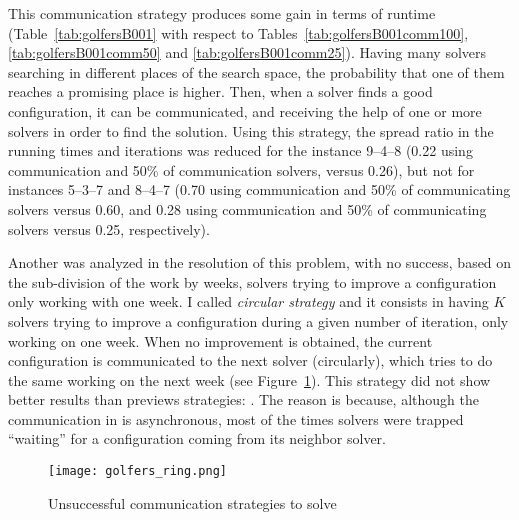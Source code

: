 This communication strategy produces some gain in terms of runtime (Table~\ref{tab:golfersB001} with respect to Tables~\ref{tab:golfersB001comm100}, \ref{tab:golfersB001comm50} and \ref{tab:golfersB001comm25}). 
Having many solvers searching in different places of the search space, the probability that one of them reaches a promising place is higher. Then, when a solver finds a good configuration, it can be communicated, and receiving the help of one or more solvers in order to find the solution.
Using this strategy, the spread ratio in the running times and iterations  was reduced for the instance 9--4--8 (0.22 using communication \oneTone{} and 50\% of communication solvers, versus 0.26), but not for instances 5--3--7 and 8--4--7 (0.70 using communication \oneTn{} and 50\% of communicating solvers versus 0.60, and 0.28 using communication \oneTone{} and 50\% of communicating solvers versus 0.25, respectively).


Another \commstr{} was analyzed in the resolution of this problem, with no success, based on the sub-division of the work by weeks, \ie solvers trying to improve a configuration only working with one week. I called \textit{circular strategy}  and it consists in having $K$ solvers trying to improve a configuration during a given number of iteration, only working on one week. When no improvement is obtained, the current configuration is communicated to the next solver (circularly), which tries to do the same working on the next week (see Figure~\ref{subfig:golfers_bad_ring}).
This strategy did not show better results than previews strategies: . The reason is because, although the communication in \posl{} is asynchronous, most of the times solvers were trapped ``waiting'' for a configuration coming from its neighbor solver.

\begin{figure}[h]
\centering
\texttt{[image: golfers\_ring.png]}	
\caption[]{Unsuccessful communication strategies to solve \SGP}
\label{subfig:golfers_bad_ring}
\end{figure}

